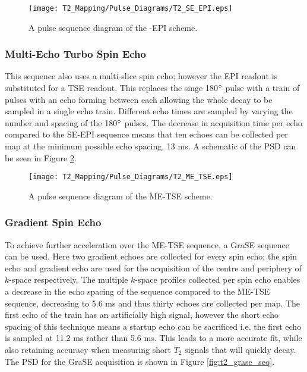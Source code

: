 \begin{figure}[H]
	\centering
	\texttt{[image: T2\_Mapping/Pulse\_Diagrams/T2\_SE\_EPI.eps]}
	\caption{A pulse sequence diagram of the -\ac{EPI} scheme.}
	\label{fig:t2_se-epi_seq}	
\end{figure}

\newpage
\subsubsection{Multi-Echo Turbo Spin Echo}
This sequence also uses a multi-slice spin echo; however the \ac{EPI} readout is substituted for a \ac{TSE} readout. This replaces the singe 180$\degree$ pulse with a train of pulses with an echo forming between each allowing the whole \ttwo decay to be sampled in a single echo train. Different echo times are sampled by varying the number and spacing of the 180$\degree$ pulses. The decrease in acquisition time per echo compared to the \ac{SE}-\ac{EPI} sequence means that ten echoes can be collected per \ttwo map at the minimum possible echo spacing, 13 ms. A schematic of the \ac{PSD} can be seen in Figure \ref{fig:t2_me-tse_seq}.

\begin{figure}[H]
	\centering
	\texttt{[image: T2\_Mapping/Pulse\_Diagrams/T2\_ME\_TSE.eps]}
	\caption{A pulse sequence diagram of the \ac{ME-TSE} scheme.}
	\label{fig:t2_me-tse_seq}	
\end{figure}

\newpage
\subsubsection{Gradient Spin Echo}

To achieve further acceleration over the \ac{ME-TSE} sequence, a \ac{GraSE} sequence can be used. Here two gradient echoes are collected for every spin echo; the spin echo and gradient echo are used for the acquisition of the centre and periphery of $k$-space respectively. The multiple $k$-space profiles collected per spin echo enables a decrease in the echo spacing of the sequence compared to the \ac{ME-TSE} sequence, decreasing to 5.6 ms and thus thirty echoes are collected per \ttwo map. The first echo of the train has an artificially high signal, however the short echo spacing of this technique means a startup echo can be sacrificed i.e. the first echo is sampled at 11.2 ms rather than 5.6 ms. This leads to a more accurate fit, while also retaining accuracy when measuring short $T_2$ signals that will quickly decay. The \ac{PSD} for the \ac{GraSE} acquisition is shown in Figure \ref{fig:t2_grase_seq}.


